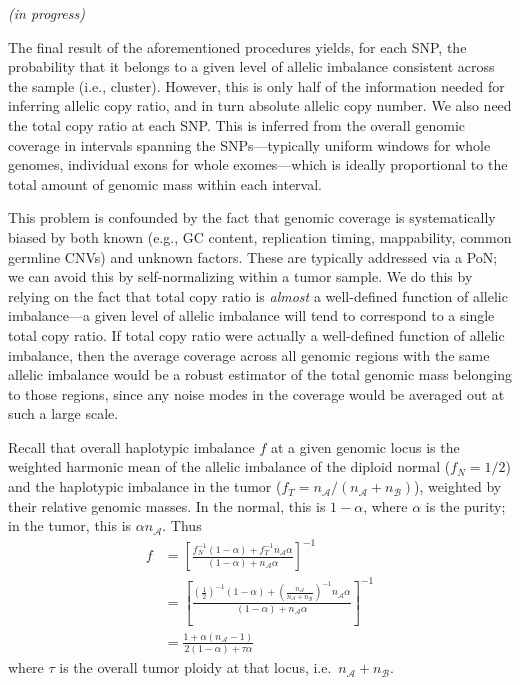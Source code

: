 \documentclass[10pt,letter]{article}
\numberwithin{equation}{section}
\newcommand{\rt}{\right}
\newcommand{\lt}{\left}
\begin{document}
\textit{(in progress)}

The final result of the aforementioned procedures yields, for each SNP, the probability that it belongs to a given level of allelic imbalance consistent across the sample (i.e., cluster). However, this is only half of the information needed for inferring allelic copy ratio, and in turn absolute allelic copy number. We also need the total copy ratio at each SNP. This is inferred from the overall genomic coverage in intervals spanning the SNPs---typically uniform windows for whole genomes, individual exons for whole exomes---which is ideally proportional to the total amount of genomic mass within each interval.

This problem is confounded by the fact that genomic coverage is systematically biased by both known (e.g., GC content, replication timing, mappability, common germline CNVs) and unknown factors. These are typically addressed via a PoN; 
we can avoid this by self-normalizing within a tumor sample. We do this by relying on the fact that total copy ratio is \textit{almost} a well-defined function of allelic imbalance---a given level of allelic imbalance will tend to correspond to a single total copy ratio. If total copy ratio were actually a well-defined function of allelic imbalance, then the average coverage across all genomic regions with the same allelic imbalance would be a robust estimator of the total genomic mass belonging to those regions, since any noise modes in the coverage would be averaged out at such a large scale.

Recall that overall haplotypic imbalance $f$ at a given genomic locus is the weighted harmonic mean of the allelic imbalance of the diploid normal ($f_N=1/2$) and the haplotypic imbalance in the tumor ($f_T=n_\mathcal{A}/(n_\mathcal{A} + n_\mathcal{B})$), weighted by their relative genomic masses. In the normal, this is $1 - \alpha$, where $\alpha$ is the purity; in the tumor, this is $\alpha n_\mathcal{A}$. Thus
\begin{align*}
f &= \lt[\frac{f_N^{-1}(1-\alpha) + f_T^{-1}n_\mathcal{A}\alpha}{(1 - \alpha) + n_\mathcal{A}\alpha}\rt]^{-1}\\
&= \lt[\frac{\lt(\frac{1}{2}\rt)^{-1}(1-\alpha) + \lt(\frac{n_\mathcal{A}}{n_\mathcal{A} + n_\mathcal{B}}\rt)^{-1}n_\mathcal{A}\alpha}{(1 - \alpha) + n_\mathcal{A}\alpha}\rt]^{-1}\\
&= \frac{1 + \alpha(n_\mathcal{A} - 1)}{2(1 - \alpha) + \tau\alpha}
\end{align*}
where $\tau$ is the overall tumor ploidy at that locus, i.e.\ $n_\mathcal{A} + n_\mathcal{B}$.
\end{document}
